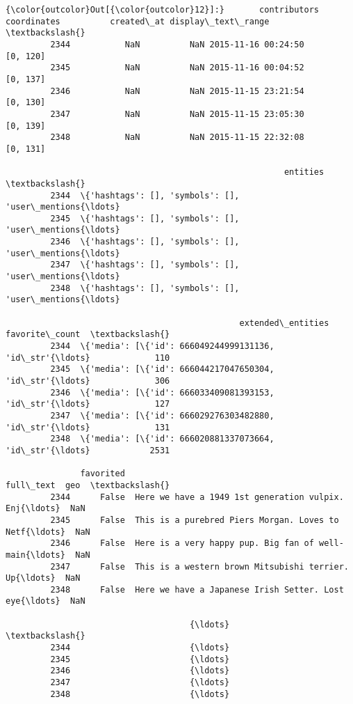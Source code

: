 \documentclass[11pt]{article}
\begin{document}
\begin{Verbatim}[commandchars=\\\{\}]
{\color{outcolor}Out[{\color{outcolor}12}]:}       contributors  coordinates          created\_at display\_text\_range  \textbackslash{}
         2344           NaN          NaN 2015-11-16 00:24:50           [0, 120]   
         2345           NaN          NaN 2015-11-16 00:04:52           [0, 137]   
         2346           NaN          NaN 2015-11-15 23:21:54           [0, 130]   
         2347           NaN          NaN 2015-11-15 23:05:30           [0, 139]   
         2348           NaN          NaN 2015-11-15 22:32:08           [0, 131]   
         
                                                        entities  \textbackslash{}
         2344  \{'hashtags': [], 'symbols': [], 'user\_mentions{\ldots}   
         2345  \{'hashtags': [], 'symbols': [], 'user\_mentions{\ldots}   
         2346  \{'hashtags': [], 'symbols': [], 'user\_mentions{\ldots}   
         2347  \{'hashtags': [], 'symbols': [], 'user\_mentions{\ldots}   
         2348  \{'hashtags': [], 'symbols': [], 'user\_mentions{\ldots}   
         
                                               extended\_entities  favorite\_count  \textbackslash{}
         2344  \{'media': [\{'id': 666049244999131136, 'id\_str'{\ldots}             110   
         2345  \{'media': [\{'id': 666044217047650304, 'id\_str'{\ldots}             306   
         2346  \{'media': [\{'id': 666033409081393153, 'id\_str'{\ldots}             127   
         2347  \{'media': [\{'id': 666029276303482880, 'id\_str'{\ldots}             131   
         2348  \{'media': [\{'id': 666020881337073664, 'id\_str'{\ldots}            2531   
         
               favorited                                          full\_text  geo  \textbackslash{}
         2344      False  Here we have a 1949 1st generation vulpix. Enj{\ldots}  NaN   
         2345      False  This is a purebred Piers Morgan. Loves to Netf{\ldots}  NaN   
         2346      False  Here is a very happy pup. Big fan of well-main{\ldots}  NaN   
         2347      False  This is a western brown Mitsubishi terrier. Up{\ldots}  NaN   
         2348      False  Here we have a Japanese Irish Setter. Lost eye{\ldots}  NaN   
         
                                     {\ldots}                          \textbackslash{}
         2344                        {\ldots}                           
         2345                        {\ldots}                           
         2346                        {\ldots}                           
         2347                        {\ldots}                           
         2348                        {\ldots}                           
         

\end{Verbatim}
\end{document}
